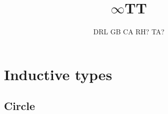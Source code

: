 \documentclass[11pt]{article}
\begin{document}
\title{$\infty$TT}
\author{DRL \qquad GB \qquad CA \qquad RH? \qquad TA?}
\maketitle



\section{Inductive types}

\subsection{Circle}


%
%
%
%
%
%
%
%
%
%
%
\end{document}
